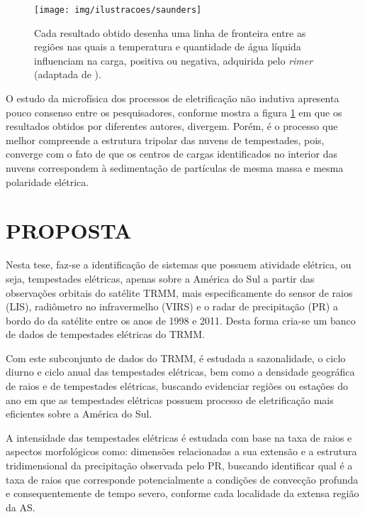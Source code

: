 \begin{figure}[htp]
\centering 
\texttt{[image: img/ilustracoes/saunders]}
\caption{Cada resultado obtido desenha uma linha de fronteira entre as regiões nas quais a temperatura e quantidade de água líquida influenciam na carga, positiva ou negativa, adquirida pelo \textit{rimer} (adaptada de ).}
\label{fig:saunders}
\end{figure}

O estudo da microfísica dos processos de eletrificação não indutiva apresenta pouco consenso entre os pesquisadores, conforme mostra a figura \ref{fig:saunders} em que os resultados obtidos por diferentes autores, divergem. Porém, é o processo que melhor compreende a estrutura tripolar das nuvens de tempestades, pois, converge com o fato de que os centros de cargas identificados no interior das nuvens correspondem à sedimentação de partículas de mesma massa e mesma polaridade elétrica.  
 
\section{PROPOSTA}
Nesta tese, faz-se a identificação de sistemas que possuem atividade elétrica, ou seja, tempestades elétricas, apenas sobre a América do Sul  a partir das observações orbitais do satélite TRMM, mais especificamente do sensor de raios (LIS), radiômetro no infravermelho (VIRS) e o radar de precipitação (PR) a bordo do da satélite entre os anos de 1998 e 2011. Desta forma cria-se um banco de dados de tempestades elétricas do TRMM.

Com este subconjunto de dados do TRMM, é estudada a sazonalidade, o ciclo diurno e ciclo anual das tempestades elétricas, bem como a densidade geográfica de raios e de tempestades elétricas, buscando evidenciar regiões ou estações do ano em que as tempestades elétricas possuem processo de eletrificação mais eficientes sobre a América do Sul.

A intensidade das tempestades elétricas é estudada com base na taxa de raios e aspectos morfológicos como: dimensões relacionadas a sua extensão e a estrutura tridimensional da precipitação observada pelo PR, buscando identificar qual é a taxa de raios que corresponde potencialmente a condições de convecção profunda e consequentemente de tempo severo, conforme cada localidade da extensa região da AS.

 
